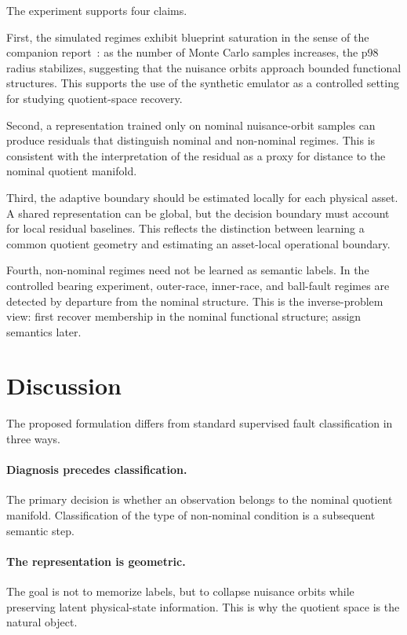 \documentclass[11pt,letterpaper]{article}
\begin{document}
The experiment supports four claims.

First, the simulated regimes exhibit blueprint saturation in the sense of the companion report~\cite{disanti2026}: as the number of Monte Carlo samples increases, the p98 radius stabilizes, suggesting that the nuisance orbits approach bounded functional structures. This supports the use of the synthetic emulator as a controlled setting for studying quotient-space recovery.

Second, a representation trained only on nominal nuisance-orbit samples can produce residuals that distinguish nominal and non-nominal regimes. This is consistent with the interpretation of the residual as a proxy for distance to the nominal quotient manifold.

Third, the adaptive boundary should be estimated locally for each physical asset. A shared representation can be global, but the decision boundary must account for local residual baselines. This reflects the distinction between learning a common quotient geometry and estimating an asset-local operational boundary.

Fourth, non-nominal regimes need not be learned as semantic labels. In the controlled bearing experiment, outer-race, inner-race, and ball-fault regimes are detected by departure from the nominal structure. This is the inverse-problem view: first recover membership in the nominal functional structure; assign semantics later.

\section{Discussion}

The proposed formulation differs from standard supervised fault classification in three ways.

\paragraph{Diagnosis precedes classification.}
The primary decision is whether an observation belongs to the nominal quotient manifold.
Classification of the type of non-nominal condition is a subsequent semantic step.

\paragraph{The representation is geometric.}
The goal is not to memorize labels, but to collapse nuisance orbits while preserving latent physical-state information.
This is why the quotient space is the natural object.
\end{document}
